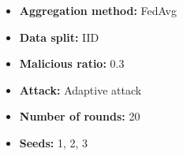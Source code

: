 \documentclass[a4j,twocolumn,dvipdfmx]{jsarticle}
\begin{document}
\begin{itemize}
    \item \textbf{Aggregation method:} FedAvg
    \item \textbf{Data split:} IID
    \item \textbf{Malicious ratio:} 0.3
    \item \textbf{Attack:} Adaptive attack
    \item \textbf{Number of rounds:} 20
    \item \textbf{Seeds:} 1, 2, 3
\end{itemize}


\begin{table}[H]
\centering

\caption{FedAvg（IID，悪性クライアント比率 0.3）における
Accuracy および Loss}

\label{tab:fedavg_iid_ratio0.3}

\footnotesize
\setlength{\tabcolsep}{2.5pt}
\renewcommand{\arraystretch}{0.90}

\end{table}
\end{document}
